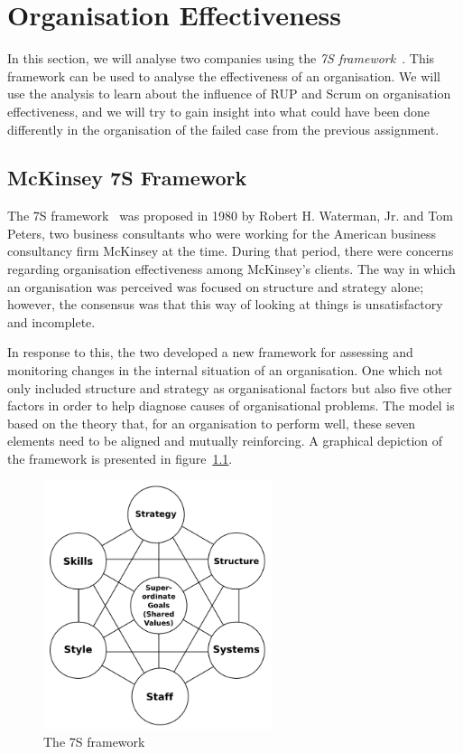 \chapter{Organisation Effectiveness}

In this section, we will analyse two companies using the \emph{7S framework}~\citep{waterman1980structure}.
This framework can be used to analyse the effectiveness of an organisation.
We will use the analysis to learn about the influence of RUP and Scrum on organisation effectiveness, and we will try to gain insight into what could have been done differently in the organisation of the failed case from the previous assignment.

\section{McKinsey 7S Framework}
The 7S framework~\citep{waterman1980structure} was proposed in 1980 by Robert H. Waterman, Jr. and Tom Peters, two business consultants who were working for the American business consultancy firm McKinsey at the time.
During that period, there were concerns regarding organisation effectiveness among McKinsey's clients.
The way in which an organisation was perceived was focused on structure and strategy alone; however, the consensus was that this way of looking at things is unsatisfactory and incomplete.

In response to this, the two developed a new framework for assessing and monitoring changes in the internal situation of an organisation.
One which not only included structure and strategy as organisational factors but also five other factors in order to help diagnose causes of organisational problems.
The model is based on the theory that, for an organisation to perform well, these seven elements need to be aligned and mutually reinforcing.
A graphical depiction of the framework is presented in figure~\ref{fig:sevens_framework}.

\begin{figure}[!ht]
    \centering
        \includegraphics[width=0.6\textwidth]{graphics/sevens_framework}
    \caption{The 7S framework}
    \label{fig:sevens_framework}
\end{figure}

